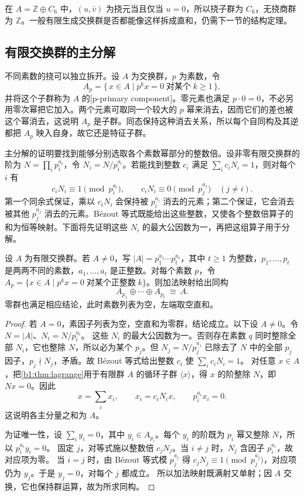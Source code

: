 在 \(A=\mathbb Z\oplus C_6\) 中，\((u,\bar v)\) 为挠元当且仅当 \(u=0\)，所以挠子群为 \(C_6\)，无挠商群为 \(\mathbb Z\)。一般有限生成交换群是否都能像这样拆成直和，仍需下一节的结构定理。

\subsection{有限交换群的主分解}
\label{b1:subsec:0902:02}

不同素数的挠可以独立拆开。设 \(A\) 为交换群，\(p\) 为素数，令
\[
	A_p=\{\,x\in A\mid p^k x=0\;\text{对某个}\;k\ge1\,\},
\]
并将这个子群称为 \(A\) 的[p-primary component]。零元素也满足 \(p\cdot0=0\)，不必另用零次幂把它加入。两个元素可取同一个较大的 \(p\) 幂来消去，因而它们的差也被这个幂消去，这说明 \(A_p\) 是子群。同态保持这种消去关系，所以每个自同构及其逆都把 \(A_p\) 映入自身，故它还是特征子群。

\ProseParagraphBreak
主分解的证明要找到能够分别选取各个素数幂部分的整数倍。设非零有限交换群的阶为 \(N=\prod_i p_i^{a_i}\)，令 \(N_i=N/p_i^{a_i}\)。若能找到整数 \(c_i\) 满足 \(\sum_i c_iN_i=1\)，则对每个 \(i\) 有
\[
	c_iN_i\equiv1\pmod{p_i^{a_i}},\qquad c_iN_i\equiv0\pmod{p_j^{a_j}}\quad(j\ne i).
\]
第一个同余式保证，乘以 \(c_iN_i\) 会保持被 \(p_i^{a_i}\) 消去的元素；第二个保证，它会消去被其他 \(p_j^{a_j}\) 消去的元素。Bézout 等式既能给出这些整数，又使各个整数倍算子的和为恒等映射。下面将先证明这些 \(N_i\) 的最大公因数为一，再把这组算子用于分解。

\begin{theorem}[有限交换群的主分解]\label{b1:thm:abelian-primary}
	设 \(A\) 为有限交换群。若 \(A\ne0\)，写 \(|A|=p_1^{a_1}\cdots p_t^{a_t}\)，其中 \(t\geq1\) 为整数，\(p_1,\ldots,p_t\) 是两两不同的素数，\(a_1,\ldots,a_t\) 是正整数。对每个素数 \(p\)，令 \(A_p=\{x\in A\mid p^kx=0\;\text{对某个正整数}\;k\}\)。则加法映射给出同构
	\[
		A_{p_1}\oplus\cdots\oplus A_{p_t}\ \cong\ A.
	\]
	零群也满足相应结论，此时素数列表为空，左端取空直和。
\end{theorem}

\begin{proof}
	若 \(A=0\)，素因子列表为空，空直和为零群，结论成立。以下设 \(A\ne0\)。令 \(N=|A|\)、\(N_i=N/p_i^{a_i}\)。 这些 \(N_i\) 的最大公因数为一。否则存在素数 \(q\) 同时整除全部 \(N_i\)，它也整除 \(N\)，所以必为某个 \(p_j\)。但 \(N_j=N/p_j^{a_j}\) 已除去了 \(N\) 中的全部 \(p_j\) 因子，\(p_j\nmid N_j\)，矛盾。故 Bézout 等式给出整数 \(c_i\) 使 \(\sum_i c_iN_i=1\)。 对任意 \(x\in A\)，把\cref{b1:thm:lagrange}用于有限群 \(A\) 的循环子群 \(\langle x\rangle\)，得 \(x\) 的阶整除 \(N\)，即 \(Nx=0\)。因此
	\[
		x=\sum_i x_i,\qquad x_i=c_iN_i x,\qquad p_i^{a_i}x_i=0.
	\]
	这说明各主分量之和为 \(A\)。

	为证唯一性，设 \(\sum_i y_i=0\)，其中 \(y_i\in A_{p_i}\)。每个 \(y_i\) 的阶既为 \(p_i\) 幂又整除 \(N\)，所以 \(p_i^{a_i}y_i=0\)。 固定 \(j\)，对等式施以整数倍 \(c_jN_j\)。当 \(i\ne j\) 时，\(N_j\) 含因子 \(p_i^{a_i}\)，故对应项为零。 当 \(i=j\) 时，由 Bézout 等式模 \(p_j^{a_j}\) 得 \(c_jN_j\equiv1\pmod{p_j^{a_j}}\)，对应项仍为 \(y_j\)。于是 \(y_j=0\)，对每个 \(j\) 都成立。 所以加法映射既满射又单射；因 \(A\) 交换，它也保持群运算，故为所求同构。
\end{proof}

